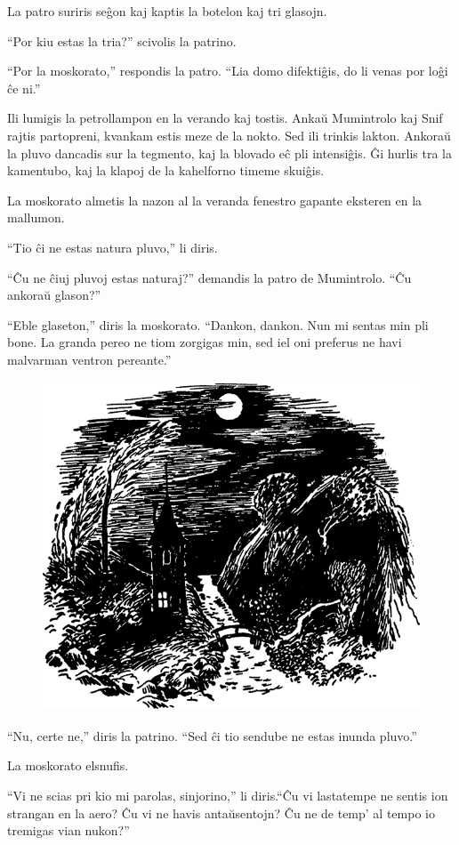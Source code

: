 La patro suriris seĝon kaj kaptis la botelon kaj tri glasojn.

``Por kiu estas la tria?'' scivolis la patrino.

``Por la moskorato,'' respondis la patro. ``Lia domo difektiĝis, do li venas por loĝi ĉe ni.''

Ili lumigis la petrollampon en la verando kaj tostis. Ankaŭ Mumintrolo kaj Snif rajtis partopreni, kvankam estis meze de la nokto. Sed ili trinkis lakton. Ankoraŭ la pluvo dancadis sur la tegmento, kaj la blovado eĉ pli intensiĝis. Ĝi hurlis tra la kamentubo, kaj la klapoj de la kahelforno timeme skuiĝis.

La moskorato almetis la nazon al la veranda fenestro gapante eksteren en la mallumon.

``Tio ĉi ne estas natura pluvo,'' li diris.

``Ĉu ne ĉiuj pluvoj estas naturaj?'' demandis la patro de Mumintrolo. ``Ĉu ankoraŭ glason?''

``Eble glaseton,'' diris la moskorato. ``Dankon, dankon. Nun mi sentas min pli bone. La granda pereo ne tiom zorgigas min, sed iel oni preferus ne havi malvarman ventron pereante.''

\begin{figure}[htbp]
\centering
\includegraphics[width=322pt,height=278pt]{1-12.png}
\caption{}
\label{1-12}
\end{figure}

``Nu, certe ne,'' diris la patrino. ``Sed ĉi tio sendube ne estas inunda pluvo.''

La moskorato elsnufis.

``Vi ne scias pri kio mi parolas, sinjorino,'' li diris.``Ĉu vi lastatempe ne sentis ion strangan en la aero? Ĉu vi ne havis antaŭsentojn? Ĉu ne de temp' al tempo io tremigas vian nukon?''

